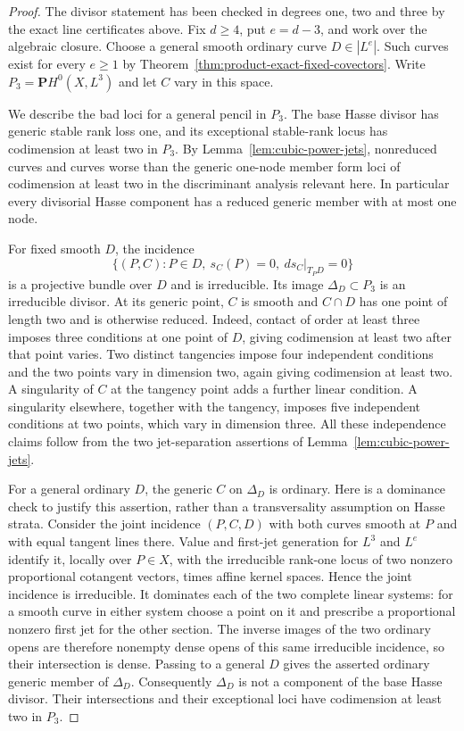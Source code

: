\begin{proof}
The divisor statement has been checked in degrees one, two and
three by the exact line certificates above.  Fix $d\ge4$, put
$e=d-3$, and work over the algebraic closure.
Choose a general smooth ordinary curve $D\in|L^e|$.
Such curves exist for every $e\ge1$ by
Theorem~\ref{thm:product-exact-fixed-covectors}.
Write $P_3=\mathbf P H^0(X,L^3)$ and let $C$ vary in this space.

We describe the bad loci for a general pencil in $P_3$.
The base Hasse divisor has generic stable rank loss one, and its
exceptional stable-rank locus has codimension at least two in
$P_3$.  By Lemma~\ref{lem:cubic-power-jets}, nonreduced curves and
curves worse than the generic one-node member form loci of
codimension at least two in the discriminant analysis relevant
here.  In particular every divisorial Hasse component has a
reduced generic member with at most one node.

For fixed smooth $D$, the incidence
\[
 \{(P,C): P\in D,\ s_C(P)=0,\ ds_C|_{T_PD}=0\}
\]
is a projective bundle over $D$ and is irreducible.  Its image
$\Delta_D\subset P_3$ is an irreducible divisor.  At its generic
point, $C$ is smooth and $C\cap D$ has one point of length two
and is otherwise reduced.  Indeed, contact of order at least
three imposes three conditions at one point of $D$, giving
codimension at least two after that point varies.  Two distinct
tangencies impose four independent conditions and the two points
vary in dimension two, again giving codimension at least two.
A singularity of $C$ at the tangency point adds a further linear
condition.  A singularity elsewhere, together with the tangency,
imposes five independent conditions at two points, which vary in
dimension three.  All these independence claims follow from
the two jet-separation assertions of
Lemma~\ref{lem:cubic-power-jets}.

For a general ordinary $D$, the generic $C$ on $\Delta_D$ is
ordinary.  Here is a dominance check to justify this assertion,
rather than a transversality assumption on Hasse strata.
Consider the joint incidence $(P,C,D)$ with both curves smooth
at $P$ and with equal tangent lines there.  Value and first-jet
generation for $L^3$ and $L^e$ identify it, locally over $P\in X$,
with the irreducible rank-one locus of two nonzero proportional
cotangent vectors, times affine kernel spaces.  Hence the joint
incidence is irreducible.  It dominates each of the two complete
linear systems: for a smooth curve in either system choose a
point on it and prescribe a proportional nonzero first jet for
the other section.  The inverse images of the two ordinary opens
are therefore nonempty dense opens of this same irreducible
incidence, so their intersection is dense.  Passing to a general
$D$ gives the asserted ordinary generic member of $\Delta_D$.
Consequently $\Delta_D$ is not a component of the base Hasse
divisor.  Their intersections and their exceptional loci have
codimension at least two in $P_3$.


\end{proof}
